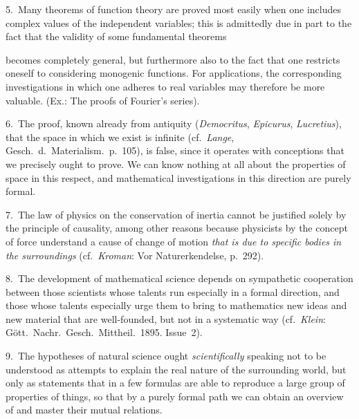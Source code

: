 \documentclass{article}
\begin{document}
5.~Many theorems of function theory are proved most easily when one includes complex values of the independent variables; this is admittedly due in part to the fact that the validity of some fundamental theorems

becomes completely general, but furthermore also to the fact that one restricts oneself to considering monogenic functions. For applications, the corresponding investigations in which one adheres to real variables may therefore be more valuable. (Ex.: The proofs of Fourier's series).

6.~The proof, known already from antiquity (\emph{Democritus}, \emph{Epicurus}, \emph{Lucretius}), that the space in which we exist is infinite (cf.\ \emph{Lange}, Gesch.\ d.\ Materialism.\ p.\ 105), is false, since it operates with conceptions that we precisely ought to prove. We can know nothing at all about the properties of space in this respect, and mathematical investigations in this direction are purely formal.

7.~The law of physics on the conservation of inertia cannot be justified solely by the principle of causality, among other reasons because physicists by the concept of force understand a cause of change of motion \emph{that is due to specific bodies in the surroundings} (cf.\ \emph{Kroman}: Vor Naturerkendelse, p.\ 292).

8.~The development of mathematical science depends on sympathetic cooperation between those scientists whose talents run especially in a formal direction, and those whose talents especially urge them to bring to mathematics new ideas and new material that are well-founded, but not in a systematic way (cf.\ \emph{Klein}: Gött.\ Nachr.\ Gesch.\ Mittheil.\ 1895. Issue~2).

9.~The hypotheses of natural science ought \emph{scientifically} speaking not to be understood as attempts to explain the real nature of the surrounding world, but only as statements that in a few formulas are able to reproduce a large group of properties of things, so that by a purely formal path we can obtain an overview of and master their mutual relations.
\end{document}
